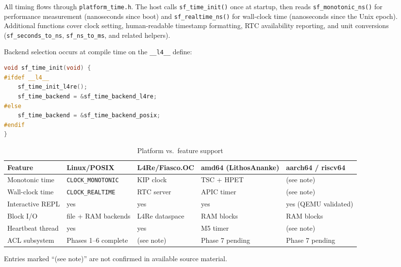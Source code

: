 All timing flows through \texttt{platform\_time.h}. The host calls
\texttt{sf\_time\_init()} once at startup, then reads
\texttt{sf\_monotonic\_ns()} for performance measurement (nanoseconds since
boot) and \texttt{sf\_realtime\_ns()} for wall-clock time (nanoseconds since
the Unix epoch). Additional functions cover clock setting, human-readable
timestamp formatting, RTC availability reporting, and unit conversions
(\texttt{sf\_seconds\_to\_ns}, \texttt{sf\_ns\_to\_ms}, and related
helpers).

Backend selection occurs at compile time on the \texttt{\_\_l4\_\_} define:

\begin{lstlisting}[language=C]
void sf_time_init(void) {
#ifdef __l4__
    sf_time_init_l4re();
    sf_time_backend = &sf_time_backend_l4re;
#else
    sf_time_backend = &sf_time_backend_posix;
#endif
}
\end{lstlisting}

\begin{table}[ht]
  \centering
  \caption{Platform vs.\ feature support}
  \label{tab:platform-features}
  \begin{tabular}{lllll}
    \toprule
    Feature & Linux/POSIX & L4Re/Fiasco.OC & amd64 (LithosAnanke) & aarch64 / riscv64 \\
    \midrule
    Monotonic time   & \texttt{CLOCK\_MONOTONIC} & KIP clock      & TSC + HPET & (see note) \\
    Wall-clock time  & \texttt{CLOCK\_REALTIME}  & RTC server     & APIC timer & (see note) \\
    Interactive REPL & yes                       & yes            & yes        & yes (QEMU validated) \\
    Block I/O        & file + RAM backends       & L4Re dataspace & RAM blocks & RAM blocks \\
    Heartbeat thread & yes                       & yes            & M5 timer   & (see note) \\
    ACL subsystem    & Phases 1--6 complete      & (see note)     & Phase 7 pending & Phase 7 pending \\
    \bottomrule
  \end{tabular}
\end{table}

Entries marked ``(see note)'' are not confirmed in available source material.

